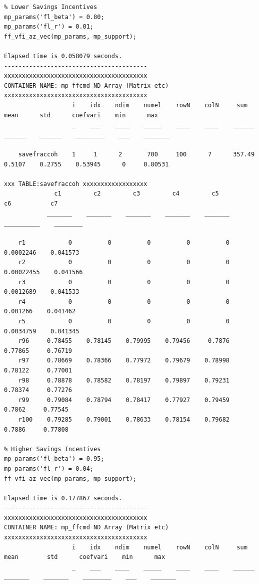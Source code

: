 \documentclass[
]{book}
\begin{document}
\begin{verbatim}
% Lower Savings Incentives
mp_params('fl_beta') = 0.80;
mp_params('fl_r') = 0.01;
ff_vfi_az_vec(mp_params, mp_support);

Elapsed time is 0.058079 seconds.
----------------------------------------
xxxxxxxxxxxxxxxxxxxxxxxxxxxxxxxxxxxxxxxx
CONTAINER NAME: mp_ffcmd ND Array (Matrix etc)
xxxxxxxxxxxxxxxxxxxxxxxxxxxxxxxxxxxxxxxx
                   i    idx    ndim    numel    rowN    colN     sum       mean      std      coefvari    min      max  
                   _    ___    ____    _____    ____    ____    ______    ______    ______    ________    ___    _______

    savefraccoh    1     1      2       700     100      7      357.49    0.5107    0.2755    0.53945      0     0.80531

xxx TABLE:savefraccoh xxxxxxxxxxxxxxxxxx
              c1         c2         c3         c4         c5           c6           c7   
            _______    _______    _______    _______    _______    __________    ________

    r1            0          0          0          0          0     0.0002246    0.041573
    r2            0          0          0          0          0    0.00022455    0.041566
    r3            0          0          0          0          0     0.0012689    0.041533
    r4            0          0          0          0          0      0.001266    0.041462
    r5            0          0          0          0          0     0.0034759    0.041345
    r96     0.78455    0.78145    0.79995    0.79456     0.7876       0.77865     0.76719
    r97     0.78669    0.78366    0.77972    0.79679    0.78998       0.78122     0.77001
    r98     0.78878    0.78582    0.78197    0.79897    0.79231       0.78374     0.77276
    r99     0.79084    0.78794    0.78417    0.77927    0.79459        0.7862     0.77545
    r100    0.79285    0.79001    0.78633    0.78154    0.79682        0.7886     0.77808

% Higher Savings Incentives
mp_params('fl_beta') = 0.95;
mp_params('fl_r') = 0.04;
ff_vfi_az_vec(mp_params, mp_support);

Elapsed time is 0.177867 seconds.
----------------------------------------
xxxxxxxxxxxxxxxxxxxxxxxxxxxxxxxxxxxxxxxx
CONTAINER NAME: mp_ffcmd ND Array (Matrix etc)
xxxxxxxxxxxxxxxxxxxxxxxxxxxxxxxxxxxxxxxx
                   i    idx    ndim    numel    rowN    colN     sum       mean        std      coefvari    min      max  
                   _    ___    ____    _____    ____    ____    ______    _______    _______    ________    ___    _______


\end{verbatim}
\end{document}
